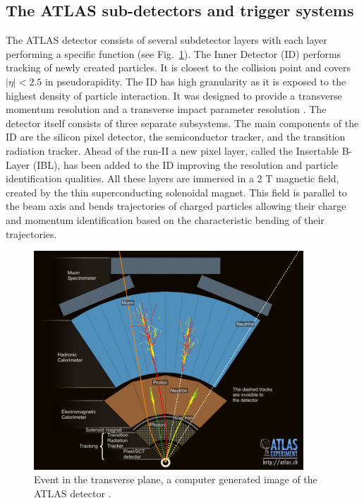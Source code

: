 \subsection{ The ATLAS sub-detectors and trigger systems}

The ATLAS detector consists of several subdetector layers with each layer performing a specific function (see Fig.~\ref{fig:event}). The Inner Detector (ID) performs tracking of newly created particles. It is closest to the collision point and covers $|\eta|<2.5$ in pseudorapidity. The ID has high granularity as it is exposed to the highest density of particle interaction. It was designed to provide a transverse momentum resolution and a transverse impact parameter resolution \citep{aad2010atlas}. The detector itself consists of three separate subsystems. The main components of the ID are the silicon pixel detector, the semiconductor tracker, and the transition radiation tracker. Ahead of the run-II a new pixel layer, called the Insertable B-Layer (IBL), has been added to the ID improving the resolution and particle identification qualities. All these layers are immersed in a 2 T magnetic field, created by the thin superconducting solenoidal magnet. This field is parallel to the beam axis and bends trajectories of charged particles allowing their charge and momentum identification based on the characteristic bending of their trajectories. 
\begin{figure}[!h]
	\centering
    \captionsetup{width=0.9\textwidth}
	\includegraphics[width=0.9\textwidth]{Chap2/0803022_01.jpg}
\caption[Event in the transverse plane]{\label{fig:event} Event in the transverse plane, a computer generated image of the ATLAS detector \cite{event}. }
\end{figure}

